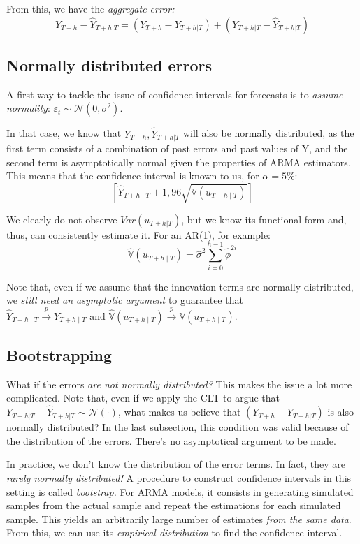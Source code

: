 \documentclass[11pt, a4paper]{report}
\theoremstyle{plain}
\theoremstyle{plain}
\theoremstyle{remark}
\begin{document}
From this, we have the \textit{aggregate error:}
$$ Y_{T+h} - \hat{Y}_{T+h|T} = (Y_{T+h} - {Y}_{T+h|T}) + (Y_{T+h|T} - \hat{Y}_{T+h|T}) $$

\subsection{Normally distributed errors}

A first way to tackle the issue of confidence intervals for forecasts is to \textit{assume normality}: $\varepsilon_{t} \sim \mathcal{N}(0, \sigma^2)$. 

In that case, we know that $Y_{T+h}, \hat{Y}_{T+h|T}$ will also be normally distributed, as the first term consists of a combination of past errors and past values of Y, and the second term is asymptotically normal given the properties of ARMA estimators. This means that the confidence interval is known to us, for $\alpha = 5\%$:
$$\left[\widehat{Y}_{T+h \mid T} \pm 1,96 \sqrt{\mathbb{V}\left(u_{T+h \mid T}\right)}\right]$$

We clearly do not observe $Var(u_{T+h|T})$, but we know its functional form and, thus, can consistently estimate it. For an AR(1), for example: 
$$\widehat{\mathbb{V}}\left(u_{T+h \mid T}\right)=\widehat{\sigma}^{2} \sum_{i=0}^{h-1} \widehat{\phi}^{2 i}$$

Note that, even if we assume that the innovation terms are normally distributed, we \textit{still need an asymptotic argument} to guarantee that $\widehat{Y}_{T+h \mid T} \stackrel{p}{\longrightarrow} Y_{T+h \mid T} \text { and } \widehat{\mathbb{V}}\left(u_{T+h \mid T}\right) \stackrel{p}{\longrightarrow} \mathbb{V}\left(u_{T+h \mid T}\right)$.

\subsection{Bootstrapping}

What if the errors \textit{are not normally distributed?} This makes the issue a lot more complicated. Note that, even if we apply the CLT to argue that $Y_{T+h|T} - \hat{Y}_{T+h|T} \sim \mathcal{N}(\cdot)$, what makes us believe that $(Y_{T+h} - {Y}_{T+h|T})$ is also normally distributed? In the last subsection, this condition was valid because of the distribution of the errors. There's no asymptotical argument to be made. 

In practice, we don't know the distribution of the error terms. In fact, they are \textit{rarely normally distributed!} A procedure to construct confidence intervals in this setting is called \textit{bootstrap.} For ARMA models, it consists in generating simulated samples from the actual sample and repeat the estimations for each simulated sample. This yields an arbitrarily large number of estimates \textit{from the same data}. From this, we can use its \textit{empirical distribution} to find the confidence interval.
\end{document}
